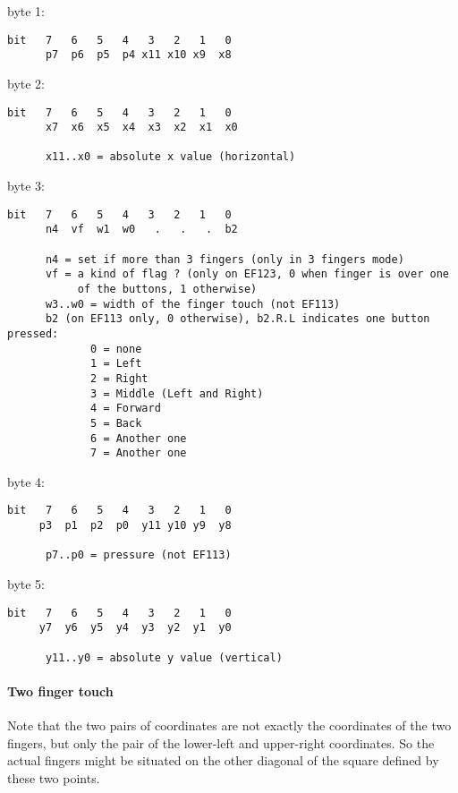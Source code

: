 \documentclass[a4paper,8pt,english]{sphinxmanual}
\begin{document}
byte 1:

\begin{Verbatim}[commandchars=\\\{\}]
bit   7   6   5   4   3   2   1   0
      p7  p6  p5  p4 x11 x10 x9  x8
\end{Verbatim}

byte 2:

\begin{Verbatim}[commandchars=\\\{\}]
bit   7   6   5   4   3   2   1   0
      x7  x6  x5  x4  x3  x2  x1  x0

      x11..x0 = absolute x value (horizontal)
\end{Verbatim}

byte 3:

\begin{Verbatim}[commandchars=\\\{\}]
bit   7   6   5   4   3   2   1   0
      n4  vf  w1  w0   .   .   .  b2

      n4 = set if more than 3 fingers (only in 3 fingers mode)
      vf = a kind of flag ? (only on EF123, 0 when finger is over one
           of the buttons, 1 otherwise)
      w3..w0 = width of the finger touch (not EF113)
      b2 (on EF113 only, 0 otherwise), b2.R.L indicates one button pressed:
             0 = none
             1 = Left
             2 = Right
             3 = Middle (Left and Right)
             4 = Forward
             5 = Back
             6 = Another one
             7 = Another one
\end{Verbatim}

byte 4:

\begin{Verbatim}[commandchars=\\\{\}]
bit   7   6   5   4   3   2   1   0
     p3  p1  p2  p0  y11 y10 y9  y8

      p7..p0 = pressure (not EF113)
\end{Verbatim}

byte 5:

\begin{Verbatim}[commandchars=\\\{\}]
bit   7   6   5   4   3   2   1   0
     y7  y6  y5  y4  y3  y2  y1  y0

      y11..y0 = absolute y value (vertical)
\end{Verbatim}


\paragraph{Two finger touch}
\label{input/devices/elantech:two-finger-touch}
Note that the two pairs of coordinates are not exactly the coordinates of the
two fingers, but only the pair of the lower-left and upper-right coordinates.
So the actual fingers might be situated on the other diagonal of the square
defined by these two points.
\end{document}
